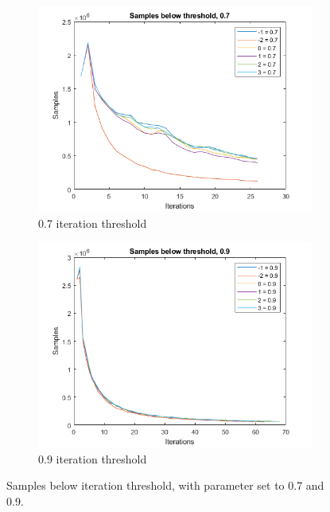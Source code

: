 \begin{figure}
    \centering
    \begin{subfigure}[b]{.49\textwidth}
        \centering
        \includegraphics[width=\textwidth]{figures/iterbelow-0.7.png}
        \caption{0.7 iteration threshold}
        \label{sfig:iter:iterbelow0.7}
    \end{subfigure}
    \hfill
    \begin{subfigure}[b]{.49\textwidth}
        \centering
        \includegraphics[width=\textwidth]{figures/iterbelow-0.9.png}
        \caption{0.9 iteration threshold}
        \label{sfig:iter:iterbelow0.9}
    \end{subfigure}
    \caption{Samples below iteration threshold, with parameter set to 0.7 and 0.9.}
    \label{fig:iter:iterbelow0.70.9}
\end{figure}

